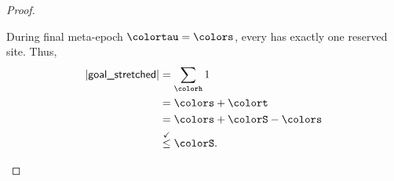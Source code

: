 \begin{proof}
\begin{proofpart}[Case $\colortau=\colors$]
During final meta-epoch $\colortau=\colors$, every \hv{} has exactly one reserved site.
Thus,
\begin{align*}
|\textsf{goal\_stretched}|
&=
\sum_{\colorh} 1\\
&= \colors + \colort\\
&= \colors + \colorS - \colors\\
&\stackrel{\checkmark}{\leq} \colorS.
\end{align*}
\end{proofpart}







\end{proof}
